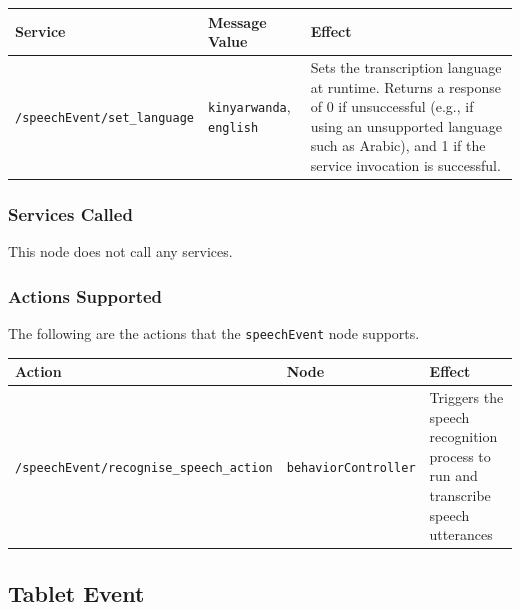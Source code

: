 \documentclass{CSSRforAfrica}
\begin{document}
{{\begin{center}
\begin{tabularx}{\linewidth}{| l | l | X|}
\hline 
{\small Service }                                                                                & {\small Message Value}    &  {\small Effect}       \\
\hline
{\footnotesize \verb+/speechEvent/set_language+ }  & {\footnotesize \verb+kinyarwanda+, \verb+english+} & {\small Sets the transcription language at runtime. Returns a response of 0 if unsuccessful (e.g., if using an unsupported language such as Arabic), and 1 if the service invocation is successful.} \\ 
\hline
\end{tabularx}
\end{center}


\subsubsection*{Services Called}
This node does not call any services.


\subsubsection*{Actions Supported}

The following are the actions that the {\small \verb+speechEvent+} node supports.
 
\begin{center}
\begin{tabularx}{\linewidth}{| l | l | X|}
\hline 
{\small Action }                                                                                & {\small  Node}    &  {\small Effect}       \\
\hline
{\footnotesize \verb+/speechEvent/recognise_speech_action+ }  & {\footnotesize \verb+behaviorController+} & {\small Triggers the speech recognition process to run and transcribe speech utterances} \\ 
\hline
\end{tabularx}
\end{center}




\newpage

\subsection{Tablet Event }

}}
\end{document}
